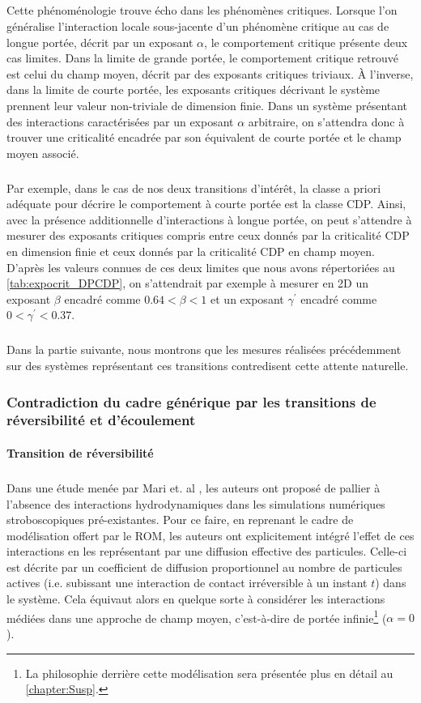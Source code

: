 \subparagraph{}Cette phénoménologie trouve écho dans les phénomènes critiques. Lorsque l'on généralise l'interaction locale sous-jacente d'un phénomène critique au cas de longue portée, décrit par un exposant $\alpha$, le comportement critique présente deux cas limites. Dans la limite de grande portée, le comportement critique retrouvé est celui du champ moyen, décrit par des exposants critiques triviaux. \`A l'inverse, dans la limite de courte portée, les exposants critiques décrivant le système prennent leur valeur non-triviale de dimension finie. Dans un système présentant des interactions caractérisées par un exposant $\alpha$ arbitraire, on s'attendra donc à trouver une criticalité encadrée par son équivalent de courte portée et le champ moyen associé.

\subparagraph{}Par exemple, dans le cas de nos deux transitions d'intérêt, la classe a priori adéquate pour décrire le comportement à courte portée est la classe CDP. Ainsi, avec la présence additionnelle d'interactions à longue portée, on peut s'attendre à mesurer des exposants critiques compris entre ceux donnés par la criticalité CDP en dimension finie et ceux donnés par la criticalité CDP en champ moyen. D'après les valeurs connues de ces deux limites que nous avons répertoriées au \autoref{tab:expocrit_DPCDP}, on s'attendrait par exemple à mesurer en 2D un exposant $\beta$ encadré comme $0.64 < \beta < 1$ et un exposant $\gamma^\prime$ encadré comme $0 < \gamma^\prime < 0.37$.

\subparagraph{}Dans la partie suivante, nous montrons que les mesures réalisées précédemment sur des systèmes représentant ces transitions contredisent cette attente naturelle.

\subsubsection{Contradiction du cadre générique par les transitions de réversibilité et d'écoulement}

\paragraph{Transition de réversibilité}

\subparagraph{}Dans une étude menée par Mari et. al \cite{mari_absorbing_2022}, les auteurs ont proposé de pallier à l'absence des interactions hydrodynamiques dans les simulations numériques stroboscopiques pré-existantes. Pour ce faire, en reprenant le cadre de modélisation offert par le ROM, les auteurs ont explicitement intégré l'effet de ces interactions en les représentant par une diffusion effective des particules. Celle-ci est décrite par un coefficient de diffusion proportionnel au nombre de particules actives (i.e. subissant une interaction de contact irréversible à un instant $t$) dans le système. Cela équivaut alors en quelque sorte à considérer les interactions médiées dans une approche de champ moyen, c'est-à-dire de portée infinie\footnote{La philosophie derrière cette modélisation sera présentée plus en détail au \autoref{chapter:Susp}.} ($\alpha = 0$). 

